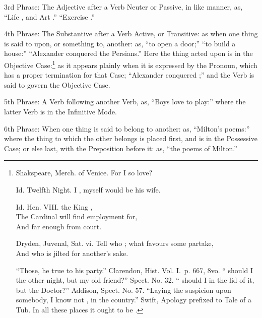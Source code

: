 3rd Phrase: The Adjective after a Verb Neuter or Passive, in like
manner, as, ``Life , and Art .'' ``Exercise
.''

4th Phrase: The Substantive after a Verb Active, or Transitive: as when
one thing is said to  upon, or  something to, another:
as, ``to open a door;'' ``to build a house:'' ``Alexander conquered the
Persians.'' Here the thing acted upon is in the Objective
Case:\footnote{
  \begin{aquote}{Shakspeare, Merch. of Venice.}
    For  I so love?
  \end{aquote}

  \begin{aquote}{Id. Twelfth Night.}
     I , myself would be his wife.
  \end{aquote}

  \begin{aquote}{Id. Hen. VIII.}
     the King ,\\
    The Cardinal will find employment for,\\
    And far enough from court.
  \end{aquote}

  \begin{aquote}{Dryden, Juvenal, Sat. vi.}
    Tell who ; what favours some partake,\\
    And who is jilted for another's sake.
  \end{aquote}

  ``Those,  he  true to his party.'' Clarendon,
  Hist. Vol. I.\ p. 667, 8vo. `` should I  the other
  night, but my old friend?'' Spect. No. 32. `` should I
   in the lid of it, but the Doctor?'' Addison, Spect. No. 57.
  ``Laying the suspicion upon somebody, I know not , in the
  country.'' Swift, Apology prefixed to Tale of a Tub. In all these
  places it ought to be .} as it appears plainly when it is
expressed by the Pronoun, which has a proper termination for that Case;
``Alexander conquered ;'' and the Verb is said to govern the
Objective Case.

5th Phrase: A Verb following another Verb, as, ``Boys love to play:''
where the latter Verb is in the Infinitive Mode.

6th Phrase: When one thing is said to belong to another: as, ``Milton's
poems:'' where the thing to which the other belongs is placed first, and
is in the Possessive Case; or else last, with the Preposition 
before it: as, ``the poems of Milton.''

